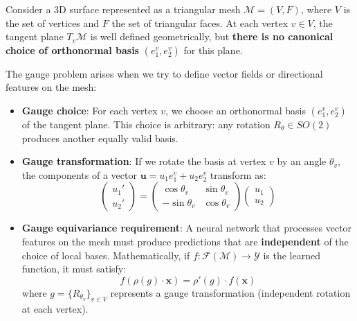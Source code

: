 \begin{example}\label{ex:gauge_mallas_3d}
Consider a 3D surface represented as a triangular mesh $\mathcal{M} = (V, F)$, where $V$ is the set of vertices and $F$ the set of triangular faces. At each vertex $v \in V$, the tangent plane $T_v\mathcal{M}$ is well defined geometrically, but \textbf{there is no canonical choice of orthonormal basis} $(e_1^v, e_2^v)$ for this plane.

The gauge problem arises when we try to define vector fields or directional features on the mesh:
\begin{itemize}
    \item \textbf{Gauge choice}: For each vertex $v$, we choose an orthonormal basis $(e_1^v, e_2^v)$ of the tangent plane. This choice is arbitrary: any rotation $R_\theta \in SO(2)$ produces another equally valid basis.

    \item \textbf{Gauge transformation}: If we rotate the basis at vertex $v$ by an angle $\theta_v$, the components of a vector $\mathbf{u} = u_1 e_1^v + u_2 e_2^v$ transform as:
    \begin{equation}
    \begin{pmatrix} u_1' \\ u_2' \end{pmatrix} = \begin{pmatrix} \cos\theta_v & \sin\theta_v \\ -\sin\theta_v & \cos\theta_v \end{pmatrix} \begin{pmatrix} u_1 \\ u_2 \end{pmatrix}
    \end{equation}

    \item \textbf{Gauge equivariance requirement}: A neural network that processes vector features on the mesh must produce predictions that are \textbf{independent} of the choice of local bases. Mathematically, if $f: \mathcal{F}(\mathcal{M}) \to \mathcal{Y}$ is the learned function, it must satisfy:
    \begin{equation}
    f(\rho(g) \cdot \mathbf{x}) = \rho'(g) \cdot f(\mathbf{x})
    \end{equation}
    where $g = \{R_{\theta_v}\}_{v \in V}$ represents a gauge transformation (independent rotation at each vertex).
\end{itemize}
\end{example}

